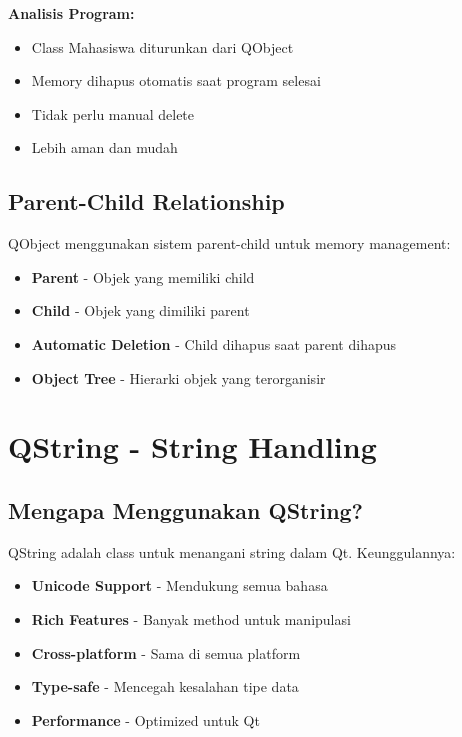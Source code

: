 \textbf{Analisis Program:}
\begin{itemize}
\item Class Mahasiswa diturunkan dari QObject
\item Memory dihapus otomatis saat program selesai
\item Tidak perlu manual delete
\item Lebih aman dan mudah
\end{itemize}

\subsection{Parent-Child Relationship}

QObject menggunakan sistem parent-child untuk memory management:

\begin{itemize}
\item \textbf{Parent} - Objek yang memiliki child
\item \textbf{Child} - Objek yang dimiliki parent
\item \textbf{Automatic Deletion} - Child dihapus saat parent dihapus
\item \textbf{Object Tree} - Hierarki objek yang terorganisir
\end{itemize}

\section{QString - String Handling}

\subsection{Mengapa Menggunakan QString?}

QString adalah class untuk menangani string dalam Qt. Keunggulannya:

\begin{itemize}
\item \textbf{Unicode Support} - Mendukung semua bahasa
\item \textbf{Rich Features} - Banyak method untuk manipulasi
\item \textbf{Cross-platform} - Sama di semua platform
\item \textbf{Type-safe} - Mencegah kesalahan tipe data
\item \textbf{Performance} - Optimized untuk Qt
\end{itemize}

